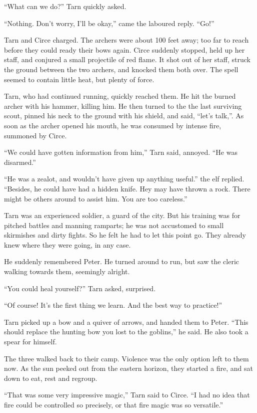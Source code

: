 ``What can we do?'' Tarn quickly asked.

``Nothing.  Don't worry, I'll be okay,'' came the laboured reply.  ``Go!''

Tarn and Circe charged.  The archers were about 100 feet away; too far to reach before they could ready their bows again.  Circe suddenly stopped, held up her staff, and conjured a small projectile of red flame.  It shot out of her staff, struck the ground between the two archers, and knocked them both over.  The spell seemed to contain little heat, but plenty of force.

Tarn, who had continued running, quickly reached them.  He hit the burned archer with his hammer, killing him.  He then turned to the the last surviving scout, pinned his neck to the ground with his shield, and said, ``let's talk,''.  As soon as the archer opened his mouth, he was consumed by intense fire, summoned by Circe.

``We could have gotten information from him,'' Tarn said, annoyed.  ``He was disarmed.''

``He was a zealot, and wouldn't have given up anything useful.''  the elf replied.  ``Besides, he could have had a hidden knife.  Hey may have thrown a rock.  There might be others around to assist him.  You are too careless.''

Tarn was an experienced soldier, a guard of the city.  But his training was for pitched battles and manning ramparts; he was not accustomed to small skirmishes and dirty fights.  So he felt he had to let this point go.  They already knew where they were going, in any case.

He suddenly remembered Peter.  He turned around to run, but saw the cleric walking towards them, seemingly alright.

``You could heal yourself?'' Tarn asked, surprised.

``Of course!  It's the first thing we learn.  And the best way to practice!''

Tarn picked up a bow and a quiver of arrows, and handed them to Peter.  ``This should replace the hunting bow you lost to the goblins,'' he said.  He also took a spear for himself.

The three walked back to their camp.  Violence was the only option left to them now.  As the sun peeked out from the eastern horizon, they started a fire, and sat down to eat, rest and regroup.

``That was some very impressive magic,'' Tarn said to Circe.  ``I had no idea that fire could be controlled so precisely, or that fire magic was so versatile.''

